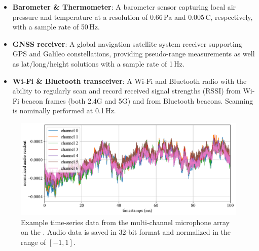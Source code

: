 \begin{itemize}
\item \textbf{Barometer \& Thermometer}: A barometer sensor capturing local air pressure and temperature at a resolution of 0.66\,Pa and 0.005\textdegree\,C, respectively, with a sample rate of 50\,Hz.
\item \textbf{GNSS receiver}: A global navigation satellite system receiver supporting GPS and Galileo constellations, providing pseudo-range measurements as well as lat/long/height solutions with a sample rate of 1\,Hz.
\item \textbf{Wi-Fi \& Bluetooth transceiver}: A Wi-Fi and Bluetooth radio with the ability to regularly scan and record received signal strengths (RSSI) from Wi-Fi beacon frames (both 2.4G and 5G) and from Bluetooth beacons. Scanning is nominally performed at 0.1\,Hz.
\end{itemize}

\begin{figure}
    \centering
    \includegraphics[width=\linewidth]{images/sampledata/audio_normalized.pdf}
    \caption{Example time-series data from the multi-channel microphone array on the \AriaDevice{}. Audio data is saved in 32-bit format and normalized in the range of $[-1, 1]$.}
    \label{fig:aria-multi-modal-audio}
\end{figure}


